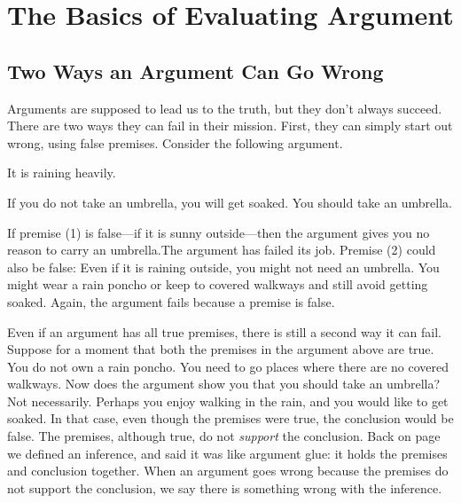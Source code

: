 \chapter{The Basics of Evaluating Argument}
\label{chap:basicevaluation}
\setlength{\parindent}{1em}



\section{Two Ways an Argument Can Go Wrong}
\label{sec:two_ways}

Arguments are supposed to lead us to the truth, but they don't always succeed. There are two ways they can fail in their mission. First, they can simply start out wrong, using false premises. Consider the following argument. 

\begin{earg*}
\item It is raining heavily.
\item If you do not take an umbrella, you will get soaked.
\itemc You should take an umbrella.
\end{earg*}

If premise (1) is false---if it is sunny outside---then the argument gives you no reason to carry an umbrella.The argument has failed its job. Premise (2) could also be false: Even if it is raining outside, you might not need an umbrella. You might wear a rain poncho or keep to covered walkways and still avoid getting soaked. Again, the argument fails because a premise is false.

Even if an argument has all true premises, there is still a second way it can fail. Suppose for a moment that both the premises in the argument above are true. You do not own a rain poncho. You need to go places where there are no covered walkways. Now does the argument show you that you should take an umbrella? Not necessarily. Perhaps you enjoy walking in the rain, and you would like to get soaked. In that case, even though the premises were true, the conclusion would be false. The premises, although true, do not \emph{support} the conclusion. Back on page \pageref{def:Inference} we defined an inference, and said  it was like argument glue: it holds the premises and conclusion together. When an argument goes wrong because the premises do not support the conclusion, we say there is something wrong with the inference. %

